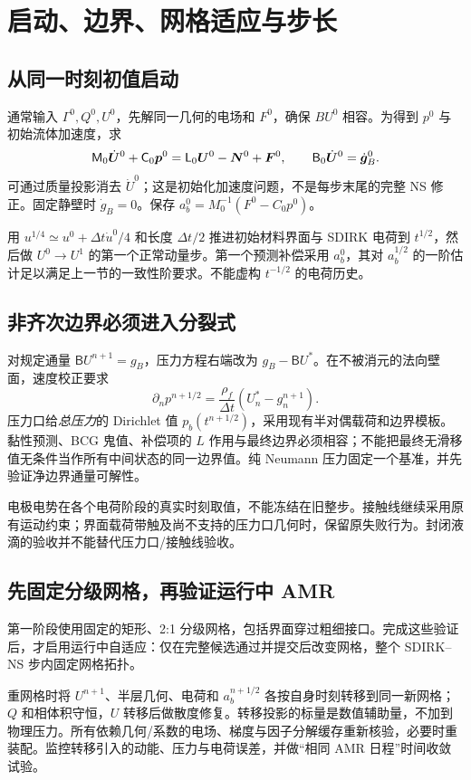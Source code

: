\documentclass[UTF8,a4paper,11pt,fontset=fandol]{ctexart}
\numberwithin{equation}{section}
\newcommand{\dt}{\Delta t}\newcommand{\dd}{\,\mathrm d}
\newcommand{\mat}[1]{\mathsf{#1}}\newcommand{\code}[1]{\nolinkurl{#1}}
\begin{document}
\section{启动、边界、网格适应与步长}
\subsection{从同一时刻初值启动}
通常输入 $\Gamma^0,Q^0,U^0$，先解同一几何的电场和 $F^0$，确保 $BU^0$ 相容。为得到 $p^0$ 与初始流体加速度，求
\begin{equation}
 \mat M_0\dot{\UU}^{0}+\mat C_0\pp^0
 =\mat L_0\UU^0-\bm N^0+\FF^0,\qquad
 \mat B_0\dot{\UU}^{0}=\dot{\bm g}_B^0.
\end{equation}
可通过质量投影消去 $\dot U^0$；这是初始化加速度问题，不是每步末尾的完整 NS 修正。固定静壁时 $\dot g_B=0$。保存 $a_b^0=M_0^{-1}(F^0-C_0p^0)$。

用 $u^{1/4}\simeq u^0+\dt\dot u^0/4$ 和长度 $\dt/2$ 推进初始材料界面与 SDIRK 电荷到 $t^{1/2}$，然后做 $U^0\to U^1$ 的第一个正常动量步。第一个预测补偿采用 $a_b^0$，其对 $a_b^{1/2}$ 的一阶估计足以满足上一节的一致性阶要求。不能虚构 $t^{-1/2}$ 的电荷历史。

\subsection{非齐次边界必须进入分裂式}
对规定通量 $\mat B U^{n+1}=g_B$，压力方程右端改为 $g_B-\mat B U^*$。在不被消元的法向壁面，速度校正要求
\begin{equation}
 \partial_np^{n+1/2}=\frac{\rho_f}{\dt}(U_n^*-g_n^{n+1}).
\end{equation}
压力口给\emph{总压力}的 Dirichlet 值 $p_b(t^{n+1/2})$，采用现有半对偶载荷和边界模板。黏性预测、BCG 鬼值、补偿项的 $L$ 作用与最终边界必须相容；不能把最终无滑移值无条件当作所有中间状态的同一边界值。纯 Neumann 压力固定一个基准，并先验证净边界通量可解性。

电极电势在各个电荷阶段的真实时刻取值，不能冻结在旧整步。接触线继续采用原有运动约束；界面载荷带触及尚不支持的压力口几何时，保留原失败行为。封闭液滴的验收并不能替代压力口/接触线验收。

\subsection{先固定分级网格，再验证运行中 AMR}
第一阶段使用固定的矩形、2:1 分级网格，包括界面穿过粗细接口。完成这些验证后，才启用运行中自适应：仅在完整候选通过并提交后改变网格，整个 SDIRK--NS 步内固定网格拓扑。

重网格时将 $U^{n+1}$、半层几何、电荷和 $a_b^{n+1/2}$ 各按自身时刻转移到同一新网格；$Q$ 和相体积守恒，$U$ 转移后做散度修复。转移投影的标量是数值辅助量，不加到物理压力。所有依赖几何/系数的电场、梯度与因子分解缓存重新核验，必要时重装配。监控转移引入的动能、压力与电荷误差，并做“相同 AMR 日程”时间收敛试验。
\end{document}
